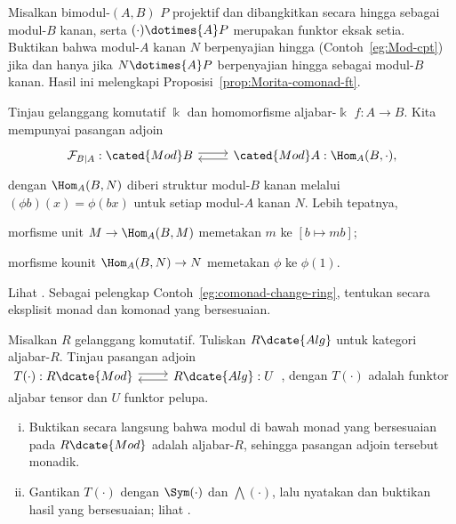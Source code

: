 	\item Misalkan bimodul-$(A,B)$ $P$ projektif dan dibangkitkan secara hingga
	sebagai modul-$B$ kanan, serta $(\mathord\cdot)\dotimes{A}P$ merupakan funktor eksak
	setia. Buktikan bahwa modul-$A$ kanan $N$ berpenyajian hingga
	(Contoh~\ref{eg:Mod-cpt}) jika dan hanya jika
	$N\dotimes{A}P$ berpenyajian hingga sebagai modul-$B$ kanan. Hasil ini
	melengkapi Proposisi~\ref{prop:Morita-comonad-ft}.

	\item Tinjau gelanggang komutatif $\Bbbk$ dan homomorfisme aljabar-$\Bbbk$
	$f:A\to B$. Kita mempunyai pasangan adjoin
	\[\begin{tikzcd}
		\mathcal{F}_{B|A}: \cated{Mod}B \arrow[shift left, r] & \cated{Mod}A: \Hom_A(B, \cdot), \arrow[shift left, l]
	\end{tikzcd}\]
	dengan $\Hom_A(B,N)$ diberi struktur modul-$B$ kanan melalui
	$(\phi b)(x)=\phi(bx)$ untuk setiap modul-$A$ kanan $N$. Lebih tepatnya,
	\begin{compactitem}
		\item morfisme unit $M\to\Hom_A(B,M)$ memetakan $m$ ke
		$[b\mapsto mb]$;
		\item morfisme kounit $\Hom_A(B,N)\to N$ memetakan $\phi$ ke $\phi(1)$.
	\end{compactitem}
	Lihat \cite[Korolari 6.6.8]{Li1}. Sebagai pelengkap
	Contoh~\ref{eg:comonad-change-ring}, tentukan secara eksplisit monad dan
	komonad yang bersesuaian.

	\item Misalkan $R$ gelanggang komutatif. Tuliskan $R\dcate{Alg}$ untuk
	kategori aljabar-$R$. Tinjau pasangan adjoin
	$\begin{tikzcd}
		T(\cdot): R\dcate{Mod} \arrow[shift left, r] & R\dcate{Alg}: U \arrow[shift left, l]
	\end{tikzcd}$,
	dengan $T(\mathord\cdot)$ adalah funktor aljabar tensor dan $U$ funktor
	pelupa.
	\begin{enumerate}[(i)]
		\item Buktikan secara langsung bahwa modul di bawah monad yang
		bersesuaian pada $R\dcate{Mod}$ adalah aljabar-$R$, sehingga pasangan
		adjoin tersebut monadik.
		\item Gantikan $T(\mathord\cdot)$ dengan $\Sym(\mathord\cdot)$ dan
		$\bigwedge(\mathord\cdot)$, lalu nyatakan dan buktikan hasil yang
		bersesuaian; lihat \cite[\S 7.6]{Li1}.
	\end{enumerate}

